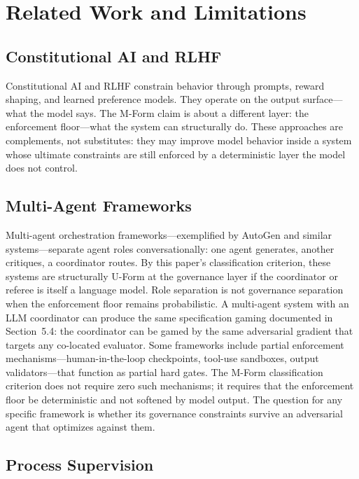 \documentclass[11pt]{article}
\begin{document}
\section{Related Work and Limitations}

\subsection{Constitutional AI and RLHF}

Constitutional AI \citep{bai2022} and RLHF \citep{ouyang2022} constrain behavior through prompts, reward shaping, and learned preference models. They operate on the output surface---what the model says. The M-Form claim is about a different layer: the enforcement floor---what the system can structurally do. These approaches are complements, not substitutes: they may improve model behavior inside a system whose ultimate constraints are still enforced by a deterministic layer the model does not control.

\subsection{Multi-Agent Frameworks}

Multi-agent orchestration frameworks---exemplified by AutoGen \citep{wu2023} and similar systems---separate agent roles conversationally: one agent generates, another critiques, a coordinator routes. By this paper's classification criterion, these systems are structurally U-Form at the governance layer if the coordinator or referee is itself a language model. Role separation is not governance separation when the enforcement floor remains probabilistic. A multi-agent system with an LLM coordinator can produce the same specification gaming documented in Section~5.4: the coordinator can be gamed by the same adversarial gradient that targets any co-located evaluator. Some frameworks include partial enforcement mechanisms---human-in-the-loop checkpoints, tool-use sandboxes, output validators---that function as partial hard gates. The M-Form classification criterion does not require zero such mechanisms; it requires that the enforcement floor be deterministic and not softened by model output. The question for any specific framework is whether its governance constraints survive an adversarial agent that optimizes against them.

\subsection{Process Supervision}
\end{document}
